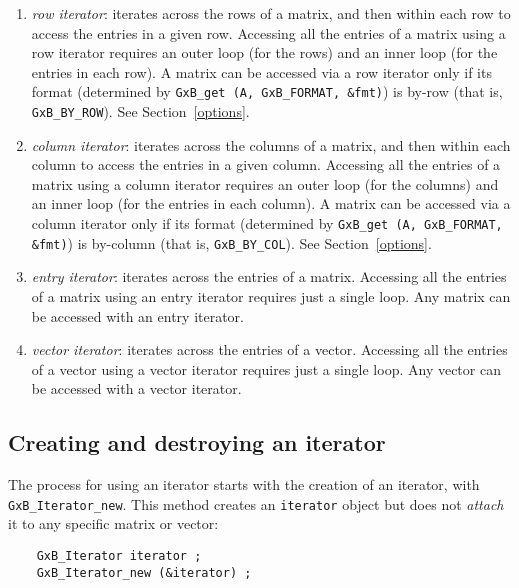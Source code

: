 \documentclass[12pt]{article}
\begin{document}
    \begin{enumerate}
    \item {\em row iterator}:  iterates across the rows of a matrix, and then
        within each row to access the entries in a given row.  Accessing all
        the entries of a matrix using a row iterator requires an outer loop
        (for the rows) and an inner loop (for the entries in each row).
        A matrix can be accessed via a row iterator only if its format
        (determined by \verb'GxB_get (A, GxB_FORMAT, &fmt)') is by-row
        (that is, \verb'GxB_BY_ROW').
        See Section~\ref{options}.
    \item {\em column iterator}:  iterates across the columns of a matrix, and
        then within each column to access the entries in a given column.
        Accessing all the entries of a matrix using a column iterator requires
        an outer loop (for the columns) and an inner loop (for the entries in
        each column).  A matrix can be accessed via a column iterator only if
        its format (determined by \verb'GxB_get (A, GxB_FORMAT, &fmt)') is
        by-column (that is, \verb'GxB_BY_COL').
        See Section~\ref{options}.
    \item {\em entry iterator}:  iterates across the entries of a matrix.
        Accessing all the entries of a matrix using an entry iterator requires
        just a single loop.  Any matrix can be accessed with an entry iterator.
    \item {\em vector iterator}:  iterates across the entries of a vector.
        Accessing all the entries of a vector using a vector iterator requires
        just a single loop.  Any vector can be accessed with a vector iterator.
    \end{enumerate}

\newpage
\subsection{Creating and destroying an iterator}

The process for using an iterator starts with the creation of an iterator, with
\verb'GxB_Iterator_new'.  This method creates an \verb'iterator' object but
does not {\em attach} it to any specific matrix or vector:

    {\footnotesize
    \begin{verbatim}
    GxB_Iterator iterator ;
    GxB_Iterator_new (&iterator) ; \end{verbatim}}
\end{document}
